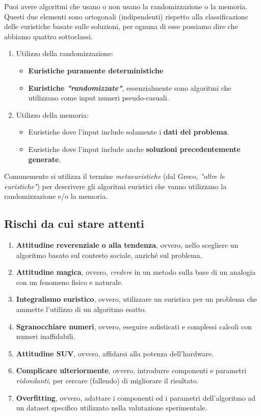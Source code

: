 \documentclass{article}
\begin{document}
Puoi avere algoritmi che usano o non usano la randomizzazione o la memoria.
Questi due elementi sono ortogonali (indipendenti) rispetto alla classificazione delle euristiche basate sulle soluzioni, per ognuna di esse possiamo dire che abbiamo quattro sottoclassi.

\begin{enumerate}
    \item Utilizzo della randomizzazione:
          \begin{itemize}
              \item \textbf{Euristiche puramente deterministiche}
              \item \textbf{Euristiche \textit{"randomizzate"}}, essenzialmente sono algoritmi che utilizzano come input numeri pseudo-casuali.
          \end{itemize}
    \item Utilizzo della memoria:
          \begin{itemize}
              \item Euristiche dove l'input include solamente i \textbf{dati del problema}.
              \item Euristiche dove l'input include anche \textbf{soluzioni precedentemente generate}.
          \end{itemize}
\end{enumerate}

Comunemente si utilizza il termine \textit{metaeuristiche} (dal Greco, \textit{"oltre le euristiche"}) per descrivere gli algoritmi euristici
che vanno utilizzano la randomizzazione e/o la memoria.

\subsection{Rischi da cui stare attenti}
\begin{enumerate}
    \item \textbf{Attitudine reverenziale o alla tendenza}, ovvero, nello scegliere un algoritmo basato sul contesto sociale, anziché sul problema.
    \item \textbf{Attitudine magica}, ovvero, \textit{credere} in un metodo sulla base di un analogia con un fenomeno fisico e naturale.
    \item \textbf{Integralismo euristico}, ovvero, utilizzare un euristica per un problema che ammette l'utilizzo di un algoritmo esatto.
    \item \textbf{Sgranocchiare numeri}, ovvero, eseguire sofisticati e complessi calcoli con numeri inaffidabili.
    \item \textbf{Attitudine SUV}, ovvero, affidarsi alla potenza dell'hardware.
    \item \textbf{Complicare ulteriormente}, ovvero, introdurre componenti e parametri \textit{ridondanti}, per cercare (fallendo) di migliorare il risultato.
    \item \textbf{Overfitting}, ovvero, adattare i componenti ed i parametri dell'algoritmo ad un dataset specifico utilizzato nella valutazione sperimentale.
\end{enumerate}
\end{document}
